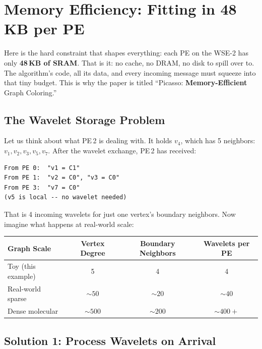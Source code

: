 \documentclass[11pt,letterpaper]{article}
\begin{document}
\section{Memory Efficiency: Fitting in 48\,KB per PE}
\label{sec:memory}

Here is the hard constraint that shapes everything: each PE on the WSE-2 has only \textbf{48\,KB of SRAM}. That is it: no cache, no DRAM, no disk to spill over to. The algorithm's code, all its data, and every incoming message must squeeze into that tiny budget. This is why the paper is titled ``Picasso: \textbf{Memory-Efficient} Graph Coloring.''

\subsection{The Wavelet Storage Problem}

Let us think about what PE\,2 is dealing with. It holds $v_4$, which has 5 neighbors: $v_1, v_2, v_3, v_5, v_7$. After the wavelet exchange, PE\,2 has received:

\begin{lstlisting}
From PE 0:  "v1 = C1"
From PE 1:  "v2 = C0", "v3 = C0"
From PE 3:  "v7 = C0"
(v5 is local -- no wavelet needed)
\end{lstlisting}

That is 4 incoming wavelets for just one vertex's boundary neighbors. Now imagine what happens at real-world scale:

\begin{center}
\renewcommand{\arraystretch}{1.2}
\begin{tabular}{lccc}
\toprule
\textbf{Graph Scale} & \textbf{Vertex Degree} & \textbf{Boundary Neighbors} & \textbf{Wavelets per PE} \\
\midrule
Toy (this example) & 5 & 4 & 4 \\
Real-world sparse & ${\sim}50$ & ${\sim}20$ & ${\sim}40$ \\
Dense molecular & ${\sim}500$ & ${\sim}200$ & ${\sim}400+$ \\
\bottomrule
\end{tabular}
\end{center}

\subsection{Solution 1: Process Wavelets on Arrival}
\end{document}
